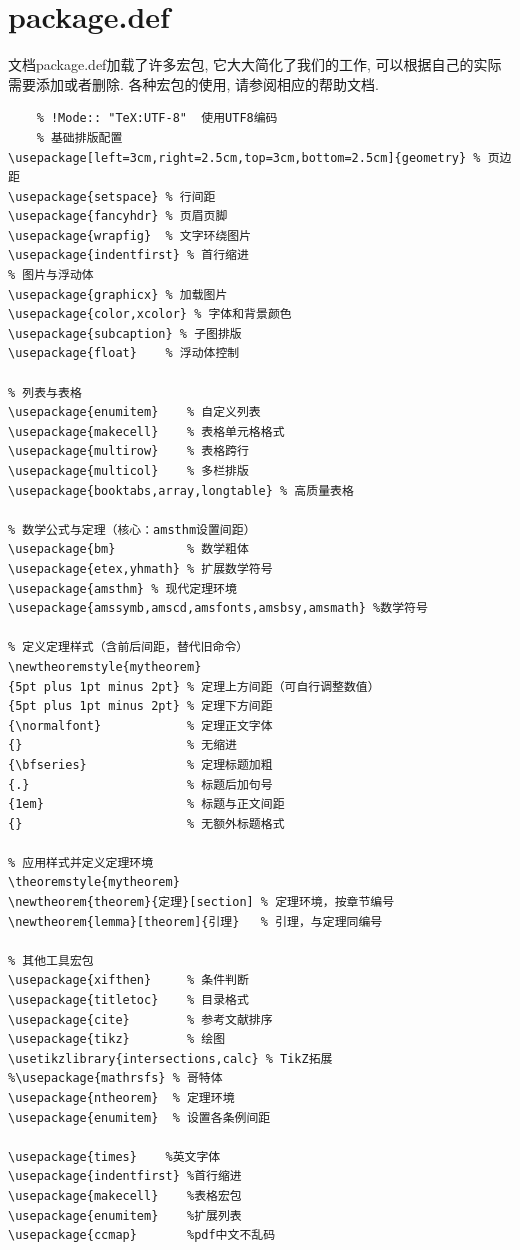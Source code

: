 \documentclass[a4paper,12pt,twoside]{ctexart}
\begin{document}
\section{package.def}
    文档package.def加载了许多宏包, 它大大简化了我们的工作, 可以根据自己的实际需要添加或者删除. 各种宏包的使用, 请参阅相应的帮助文档.
    \begin{verbatim}
    % !Mode:: "TeX:UTF-8"  使用UTF8编码
    % 基础排版配置
\usepackage[left=3cm,right=2.5cm,top=3cm,bottom=2.5cm]{geometry} % 页边距
\usepackage{setspace} % 行间距
\usepackage{fancyhdr} % 页眉页脚
\usepackage{wrapfig}  % 文字环绕图片
\usepackage{indentfirst} % 首行缩进
% 图片与浮动体
\usepackage{graphicx} % 加载图片
\usepackage{color,xcolor} % 字体和背景颜色
\usepackage{subcaption} % 子图排版
\usepackage{float}    % 浮动体控制

% 列表与表格
\usepackage{enumitem}    % 自定义列表
\usepackage{makecell}    % 表格单元格格式
\usepackage{multirow}    % 表格跨行
\usepackage{multicol}    % 多栏排版
\usepackage{booktabs,array,longtable} % 高质量表格

% 数学公式与定理（核心：amsthm设置间距）
\usepackage{bm}          % 数学粗体
\usepackage{etex,yhmath} % 扩展数学符号
\usepackage{amsthm} % 现代定理环境
\usepackage{amssymb,amscd,amsfonts,amsbsy,amsmath} %数学符号

% 定义定理样式（含前后间距，替代旧命令）
\newtheoremstyle{mytheorem}
{5pt plus 1pt minus 2pt} % 定理上方间距（可自行调整数值）
{5pt plus 1pt minus 2pt} % 定理下方间距
{\normalfont}            % 定理正文字体
{}                       % 无缩进
{\bfseries}              % 定理标题加粗
{.}                      % 标题后加句号
{1em}                    % 标题与正文间距
{}                       % 无额外标题格式

% 应用样式并定义定理环境
\theoremstyle{mytheorem}
\newtheorem{theorem}{定理}[section] % 定理环境，按章节编号
\newtheorem{lemma}[theorem]{引理}   % 引理，与定理同编号

% 其他工具宏包
\usepackage{xifthen}     % 条件判断
\usepackage{titletoc}    % 目录格式
\usepackage{cite}        % 参考文献排序
\usepackage{tikz}        % 绘图
\usetikzlibrary{intersections,calc} % TikZ拓展
%\usepackage{mathrsfs} % 哥特体
\usepackage{ntheorem}  % 定理环境
\usepackage{enumitem}  % 设置各条例间距

\usepackage{times}    %英文字体
\usepackage{indentfirst} %首行缩进
\usepackage{makecell}    %表格宏包
\usepackage{enumitem}    %扩展列表
\usepackage{ccmap}       %pdf中文不乱码
\end{verbatim}
\end{document}
